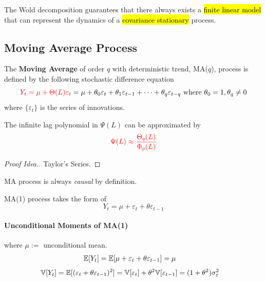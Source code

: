 \documentclass[11pt]{article}
\begin{document}
			\begin{corollary}
				The Wold decomposition guarantees that there always exists a \hl{finite linear model} that can represent the dynamics of a \hl{covariance stationary} process.
			\end{corollary}
		\subsection{Moving Average Process}
			\begin{definition}
				The \textbf{Moving Average} of order $q$ with deterministic trend, MA($q$), process is defined by the following stochastic difference equation
				\begin{equation}
					\textcolor{red}{Y_t = \mu + \Theta(L) \varepsilon_t} = \mu + \theta_0 \varepsilon_t + \theta_1 \varepsilon_{t-1} + \dots + \theta_q \varepsilon_{t-q} \text{{ where }} \theta_0 = 1, \theta_q \neq 0
				\end{equation}
				where $\{\varepsilon_t\}$ is the series of innovations.
			\end{definition}
			
			\begin{lemma}
				The infinite lag polynomial in $\Psi(L)$ can be approximated by
				\begin{equation}
					\textcolor{red}{\Psi(L) \approx \frac{\Theta_q(L)}{\Phi_p(L)}}
				\end{equation}
				\begin{proof}[Proof Idea.]
					Taylor's Series.
				\end{proof}
			\end{lemma}
			
			\begin{remark}
				MA process is always \emph{causal} by definition.
			\end{remark}
			
			\begin{definition}
				MA(1) process takes the form of 
				\begin{equation}
					Y_t = \mu + \varepsilon_t + \theta \varepsilon_{t-1}
				\end{equation}
			\end{definition}
			
			\paragraph{Unconditional Moments of MA(1)}where $\mu :=$ unconditional mean.
				\begin{align}
					\mathbb{E}[{Y_t}] = \mathbb{E}[{\mu + \varepsilon_t + \theta \varepsilon_{t-1}}] &= \mu 
				\end{align}
				\begin{align}
					\mathbb{V}[{Y_t}] &= \mathbb{E}[{(\varepsilon_t + \theta \varepsilon_{t-1})^2}]
					= \mathbb{V}[{\varepsilon_t}] + \theta^2 \mathbb{V}[{\varepsilon_{t-1}}]
					= (1 + \theta^2) \sigma_\varepsilon^2
				\end{align}
\end{document}
